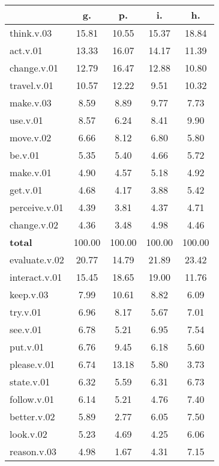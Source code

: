 \begin{table}[h!]
\begin{center}
\begin{tabular}{| l || c | c | c | c |}\hline
 & {\bf g.} & {\bf p.} & {\bf i.} & {\bf h.} \\\hline\hline
think.v.03 & 15.81  & 10.55  & 15.37  & 18.84 \\\hline
act.v.01 & 13.33  & 16.07  & 14.17  & 11.39 \\\hline
change.v.01 & 12.79  & 16.47  & 12.88  & 10.80 \\\hline
travel.v.01 & 10.57  & 12.22  & 9.51  & 10.32 \\\hline
make.v.03 & 8.59  & 8.89  & 9.77  & 7.73 \\\hline
use.v.01 & 8.57  & 6.24  & 8.41  & 9.90 \\\hline
move.v.02 & 6.66  & 8.12  & 6.80  & 5.80 \\\hline
be.v.01 & 5.35  & 5.40  & 4.66  & 5.72 \\\hline
make.v.01 & 4.90  & 4.57  & 5.18  & 4.92 \\\hline
get.v.01 & 4.68  & 4.17  & 3.88  & 5.42 \\\hline
perceive.v.01 & 4.39  & 3.81  & 4.37  & 4.71 \\\hline
change.v.02 & 4.36  & 3.48  & 4.98  & 4.46 \\\hline\hline
{{\bf total}} & 100.00  & 100.00  & 100.00  & 100.00 \\\hline\hline\hline
evaluate.v.02 & 20.77  & 14.79  & 21.89  & 23.42 \\\hline
interact.v.01 & 15.45  & 18.65  & 19.00  & 11.76 \\\hline
keep.v.03 & 7.99  & 10.61  & 8.82  & 6.09 \\\hline
try.v.01 & 6.96  & 8.17  & 5.67  & 7.01 \\\hline
see.v.01 & 6.78  & 5.21  & 6.95  & 7.54 \\\hline
put.v.01 & 6.76  & 9.45  & 6.18  & 5.60 \\\hline
please.v.01 & 6.74  & 13.18  & 5.80  & 3.73 \\\hline
state.v.01 & 6.32  & 5.59  & 6.31  & 6.73 \\\hline
follow.v.01 & 6.14  & 5.21  & 4.76  & 7.40 \\\hline
better.v.02 & 5.89  & 2.77  & 6.05  & 7.50 \\\hline
look.v.02 & 5.23  & 4.69  & 4.25  & 6.06 \\\hline
reason.v.03 & 4.98  & 1.67  & 4.31  & 7.15 \\\hline\hline

\end{tabular}
\end{center}
\end{table}
